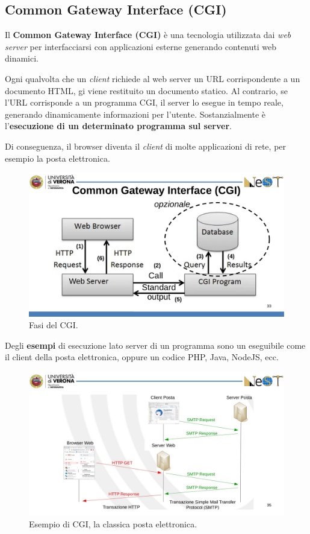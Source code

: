 \documentclass[a4paper]{article}
\begin{document}
	\newpage
	
	\subsection{Common Gateway Interface (CGI)}
	
	Il \textcolor{Red3}{\textbf{Common Gateway Interface (CGI)}} è una tecnologia utilizzata dai \emph{web server} per interfacciarsi con applicazioni esterne generando contenuti web dinamici.\newline
	
	\noindent
	Ogni qualvolta che un \emph{client} richiede al web server un URL corrispondente a un documento HTML, gi viene restituito un documento statico. Al contrario, se l'URL corrisponde a un programma CGI, il server lo esegue in tempo reale, generando dinamicamente informazioni per l'utente. Sostanzialmente è l'\textbf{esecuzione di un determinato programma sul server}.
	
	Di conseguenza, il browser diventa il \emph{client} di molte applicazioni di rete, per esempio la posta elettronica.
	
	\begin{figure}[!htp]
		\centering
		\includegraphics[width=\textwidth]{img/CGI.pdf}
		\caption{Fasi del CGI.}
	\end{figure}

	\noindent
	Degli \textcolor{Green4}{\textbf{esempi}} di esecuzione lato server di un programma sono un eseguibile come il client della posta elettronica, oppure un codice PHP, Java, NodeJS, ecc.\newpage
	
	\begin{figure}[!htp]
		\centering
		\includegraphics[width=\textwidth]{img/CGI_esempio.pdf}
		\caption{Esempio di CGI, la classica posta elettronica.}
	\end{figure}
	
\end{document}
